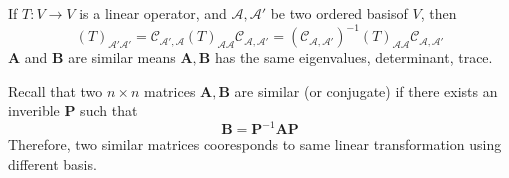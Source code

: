 \begin{remark}
If $T:V\to V$ is a linear operator, and $\mathcal{A},\mathcal{A}'$ be two ordered basisof $V$, then
\[
(T)_{\mathcal{A}'\mathcal{A}'}
=
\mathcal{C}_{\mathcal{A}',\mathcal{A}}
(T)_{\mathcal{A}\mathcal{A}}\mathcal{C}_{\mathcal{A},\mathcal{A}'}
=
(\mathcal{C}_{\mathcal{A},\mathcal{A}'})^{-1}
(T)_{\mathcal{A}\mathcal{A}}\mathcal{C}_{\mathcal{A},\mathcal{A}'}
\]
$\bm A$ and $\bm B$ are similar means $\bm A,\bm B$ has the same eigenvalues, determinant, trace.
\end{remark}

Recall that two $n\times n$ matrices $\bm A,\bm B$ are similar (or conjugate) if there exists an inverible $\bm P$ such that
\[
\bm B=\bm P^{-1}\bm A\bm P
\]
Therefore, two similar matrices cooresponds to same linear transformation using different basis.














